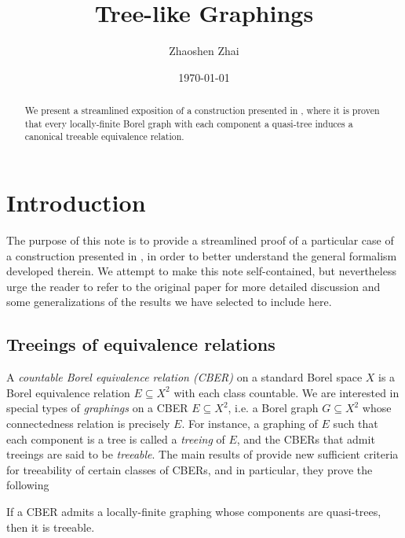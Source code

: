 \documentclass{amsart}
\begin{document}
    \title{Tree-like Graphings}
    \author{Zhaoshen Zhai}
    \date{\today}

    \begin{abstract}
        We present a streamlined exposition of a construction presented in \cite{CPTT23}, where it is proven that every locally-finite Borel graph with each component a quasi-tree induces a canonical treeable equivalence relation. {\color{red}{Write some more details...}}
    \end{abstract}

    \maketitle

    \section{Introduction}

    The purpose of this note is to provide a streamlined proof of a particular case of a construction presented in \cite{CPTT23}, in order to better understand the general formalism developed therein. We attempt to make this note self-contained, but nevertheless urge the reader to refer to the original paper for more detailed discussion and some generalizations of the results we have selected to include here.

    \subsection{Treeings of equivalence relations}

    A \textit{countable Borel equivalence relation (CBER)} on a standard Borel space $X$ is a Borel equivalence relation $E\subseteq X^2$ with each class countable. We are interested in special types of \textit{graphings} on a CBER $E\subseteq X^2$, i.e. a Borel graph $G\subseteq X^2$ whose connectedness relation is precisely $E$. For instance, a graphing of $E$ such that each component is a tree is called a \textit{treeing} of $E$, and the CBERs that admit treeings are said to be \textit{treeable}. The main results of \cite{CPTT23} provide new sufficient criteria for treeability of certain classes of CBERs, and in particular, they prove the following

    \begin{mainTheorem}\label{thm:treeing_quasi-trees}
        If a CBER admits a locally-finite graphing whose components are quasi-trees, then it is treeable.
    \end{mainTheorem}
\end{document}
